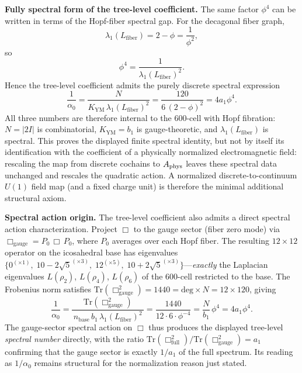 \documentclass[12pt,a4paper]{article}
\theoremstyle{definition}
\begin{document}
\textbf{Fully spectral form of the tree-level coefficient.}  The same factor $\phi^4$ can be written in terms of the Hopf-fiber spectral gap.  For the decagonal fiber graph,
\begin{equation}
\lambda_1(L_{\mathrm{fiber}}) = 2 - \phi = \frac{1}{\phi^2},
\end{equation}
so
\begin{equation}
\phi^4 = \frac{1}{\lambda_1(L_{\mathrm{fiber}})^2}.
\end{equation}
Hence the tree-level coefficient admits the purely discrete spectral expression
\begin{equation}
\frac{1}{\alpha_0}
= \frac{N}{K_{\mathrm{YM}}\,\lambda_1(L_{\mathrm{fiber}})^2}
= \frac{120}{6\,(2-\phi)^2}
= 4a_1\phi^4.
\label{eq:alpha0_spectral}
\end{equation}
All three numbers are therefore internal to the 600-cell with Hopf fibration: $N=|2I|$ is combinatorial, $K_{\mathrm{YM}} = b_1$ is gauge-theoretic, and $\lambda_1(L_{\mathrm{fiber}})$ is spectral.  This proves the displayed finite spectral identity, but not by itself its identification with the coefficient of a physically normalized electromagnetic field: rescaling the map from discrete cochains to $A_{\rm phys}$ leaves these spectral data unchanged and rescales the quadratic action.  A normalized discrete-to-continuum $U(1)$ field map (and a fixed charge unit) is therefore the minimal additional structural axiom.

\textbf{Spectral action origin.}  The tree-level coefficient also admits a direct spectral action characterization.  Project $\Box$ to the gauge sector (fiber zero mode) via $\Box_{\mathrm{gauge}} = P_0\,\Box\,P_0$, where $P_0$ averages over each Hopf fiber.  The resulting $12\times12$ operator on the icosahedral base has eigenvalues $\{0^{(\times1)},\; 10-2\sqrt{5}^{(\times3)},\; 12^{(\times5)},\; 10+2\sqrt{5}^{(\times3)}\}$---\emph{exactly} the Laplacian eigenvalues $L(\rho_2)$, $L(\rho_4)$, $L(\rho_6)$ of the 600-cell restricted to the base.  The Frobenius norm satisfies $\mathrm{Tr}(\Box_{\mathrm{gauge}}^2) = 1440 = \mathrm{deg}\times N = 12\times 120$, giving
\begin{equation}
\frac{1}{\alpha_0} = \frac{\mathrm{Tr}(\Box_{\mathrm{gauge}}^2)}{\,n_{\mathrm{base}}\,b_1\,\lambda_1(L_{\mathrm{fiber}})^2\,}
= \frac{1440}{12\cdot 6\cdot\phi^{-4}} = \frac{N}{b_1}\,\phi^4 = 4a_1\phi^4.
\label{eq:alpha0_box}
\end{equation}
The gauge-sector spectral action on $\Box$ thus produces the displayed tree-level \emph{spectral number} directly, with the ratio $\mathrm{Tr}(\Box^2_{\mathrm{full}})/\mathrm{Tr}(\Box^2_{\mathrm{gauge}}) = a_1$ confirming that the gauge sector is exactly $1/a_1$ of the full spectrum.  Its reading as $1/\alpha_0$ remains structural for the normalization reason just stated.
\end{document}
